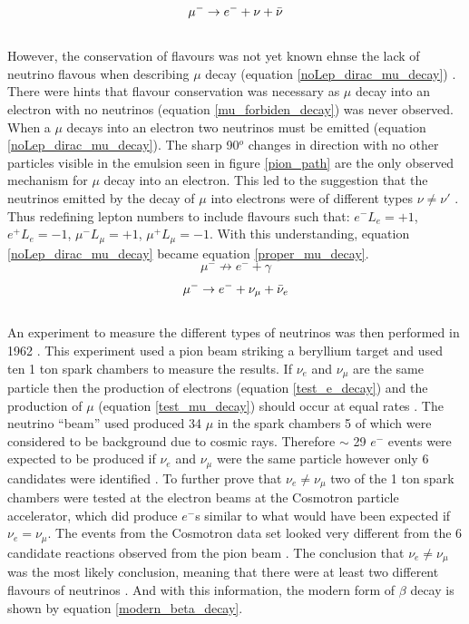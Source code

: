 \begin{equation}
    \mu^- \rightarrow e^- + \nu + \Bar{\nu}
    \label{noLep_dirac_mu_decay}
\end{equation}
\\However, the conservation of flavours was not yet known ehnse the lack of neutrino flavous when describing $\mu$ decay (equation \ref{noLep_dirac_mu_decay}) \cite{griffiths2008book} \cite{griffiths2008neutrino1.5}. There were hints that flavour conservation was necessary as $\mu$ decay into an electron with no neutrinos (equation \ref{mu_forbiden_decay}) was never observed. When a $\mu$ decays into an electron two neutrinos must be emitted (equation \ref{noLep_dirac_mu_decay}). The sharp 90$^o$ changes in direction with no other particles visible in the emulsion seen in figure \ref{pion_path} are the only observed mechanism for $\mu$ decay into an electron. This led to the suggestion that the neutrinos emitted by the decay of $\mu$ into electrons were of different types $\nu \not= \nu'$ \cite{Lee:1960tja} \cite{griffiths2008book} \cite{griffiths2008neutrino1.5}. Thus redefining lepton numbers to include flavours such that: $e^- L_e = +1$, $e^+ L_e = -1$, $\mu^- L_\mu = +1 $, $\mu^+ L_\mu = -1 $. With this understanding, equation \ref{noLep_dirac_mu_decay} became equation \ref{proper_mu_decay}.
\begin{equation}
    \mu^- \not\to e^- + \gamma
    \label{mu_forbiden_decay}
\end{equation}
\begin{equation}
    \mu^- \rightarrow e^- + \nu_\mu + \Bar{\nu}_e
    \label{proper_mu_decay}
\end{equation}
\\An experiment to measure the different types of neutrinos was then performed in 1962 \cite{DanbyG1962PhysRevLett.9.36}. This experiment used a pion beam striking a beryllium target and used ten 1 ton spark chambers to measure the results. If $\nu_e$ and $\nu_\mu$ are the same particle then the production of electrons (equation \ref{test_e_decay}) and the production of $\mu$ (equation \ref{test_mu_decay}) should occur at equal rates \cite{DanbyG1962PhysRevLett.9.36}. The neutrino ``beam'' used produced 34 $\mu$ in the spark chambers 5 of which were considered to be background due to cosmic rays. Therefore $\sim$ 29 $e^-$ events were expected to be produced if $\nu_e$ and $\nu_\mu$ were the same particle however only 6 candidates were identified \cite{DanbyG1962PhysRevLett.9.36}. To further prove that $\nu_e \not= \nu_\mu$ two of the 1 ton spark chambers were tested at the electron beams at the Cosmotron particle accelerator, which did produce $e^-$s similar to what would have been expected if $\nu_e = \nu_\mu$. The events from the Cosmotron data set looked very different from the 6 candidate reactions observed from the pion beam \cite{DanbyG1962PhysRevLett.9.36}. The conclusion that $\nu_e \not= \nu_\mu$ was the most likely conclusion, meaning that there were at least two different flavours of neutrinos \cite{DanbyG1962PhysRevLett.9.36}. And with this information, the modern form of $\beta$ decay is shown by equation \ref{modern_beta_decay}.
